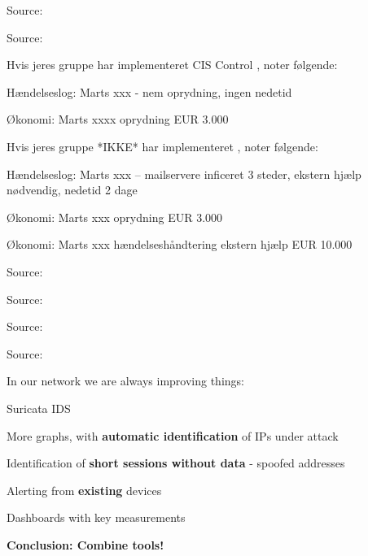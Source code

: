\documentclass[Screen16to9,17pt]{foils}
\begin{document}
Source:



\begin{quote}

\end{quote}

Source:



Hvis jeres gruppe har implementeret CIS Control , noter følgende:
\begin{list2}
\item Hændelseslog: Marts xxx - nem oprydning, ingen nedetid
\item Økonomi: Marts xxxx oprydning EUR 3.000
\end{list2}


Hvis jeres gruppe *IKKE* har implementeret , noter følgende:
\begin{list2}
\item Hændelseslog: Marts xxx -- mailservere inficeret 3 steder, ekstern hjælp nødvendig, nedetid 2 dage
\item Økonomi: Marts xxx oprydning EUR 3.000
\item Økonomi: Marts xxx hændelseshåndtering ekstern hjælp EUR 10.000
\end{list2}





\slide{}
\begin{quote}

\end{quote}

Source:


\slide{}
\begin{quote}

\end{quote}

Source:


\slide{}
\begin{quote}

\end{quote}

Source:


\slide{}
\begin{quote}

\end{quote}

Source:






In our network we are always improving things:
\begin{list1}
\item Suricata IDS 
\item More graphs, with {\bf automatic identification} of IPs under attack
\item Identification of {\bf short sessions without data} - spoofed addresses
\item Alerting from {\bf existing} devices
\item Dashboards with key measurements
\end{list1}

\vskip 2cm
\centerline{\bf\Large Conclusion: Combine tools!}


\myquestionspage

\hlkprofiluk
\end{document}
